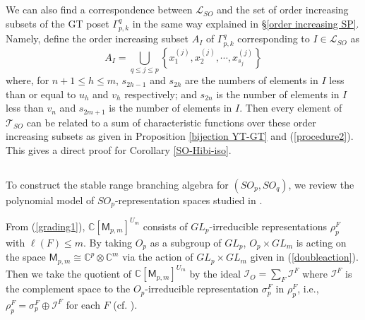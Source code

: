 \documentclass[11pt]{amsart}
\numberwithin{equation}{subsection}
\begin{document}
\subsection{}
We can also find a correspondence between $\mathcal{L}_{SO}$ 
and the set of order increasing subsets of the GT poset $\Gamma_{p,k}^{q}$ in 
the same way explained in \S \ref{order increasing SP}. 
Namely, define the order increasing subset $A_{I}$ of $\Gamma _{p,k}^{q}$ 
corresponding to $I\in \mathcal{L}_{SO}$ as
\begin{equation}
A_{I} = \bigcup_{q \leq j \leq p} 
\left\{ x_{1}^{(j)}, x_{2}^{(j)}, \cdots, x_{s_{j}}^{(j)} \right\}
\end{equation}
where, for $n+1 \leq h \leq m$, $s_{2h-1}$ and $s_{2h}$ are the numbers of elements
in $I$ less than or equal to $u_h$ and $v_h$ respectively; and
$s_{2n}$ is the number of elements in $I$ less 
than $v_n$ and $s_{2m+1}$ is the number of elements in $I$. 
Then every element of $\mathcal{T}_{SO}$ can be related to a sum of 
characteristic functions over these order increasing subsets as given in
Proposition \ref{bijection YT-GT} and (\ref{procedure2}). 
This gives a direct proof for Corollary \ref{SO-Hibi-iso}.



\subsection{}

To construct the stable range branching algebra for $({SO}_{p},{SO}_{q})$, we review the
polynomial model of ${SO}_{p}$-representation spaces studied in \cite{Ki09}.

\smallskip

From (\ref{grading1}), $\mathbb{C}[\mathsf{M}_{p,m}]^{U_{m}}$ consists of 
${GL}_{p}$-irreducible representations $\rho _{p}^{F}$ with $\ell (F)\leq m$.
By taking ${O}_{p}$ as a subgroup of ${GL}_{p}$, ${O}_{p}\times {GL}_{m}$ is
acting on the space $\mathsf{M}_{p,m} \cong \mathbb{C}^p \otimes \mathbb{C}^m$ via 
the action of ${GL}_{p}\times {GL}_{m}$ given in (\ref{doubleaction}). Then we take 
the quotient of $\mathbb{C}[\mathsf{M}_{p,m}]^{U_{m}}$ 
by the ideal $\mathcal{I}_{{O}}=\sum_{F}\mathcal{I}^{F}$ where $\mathcal{I}^{F}$ is 
the complement space to the ${O}_{p}$-irreducible representation $\sigma _{p}^{F}$ 
in $\rho _{p}^{F}$, i.e., $\rho _{p}^{F}=\sigma _{p}^{F}\oplus \mathcal{I}^{F}$ 
for each $F$ (cf. \cite[\S 19.5]{FH91}). 
\end{document}
